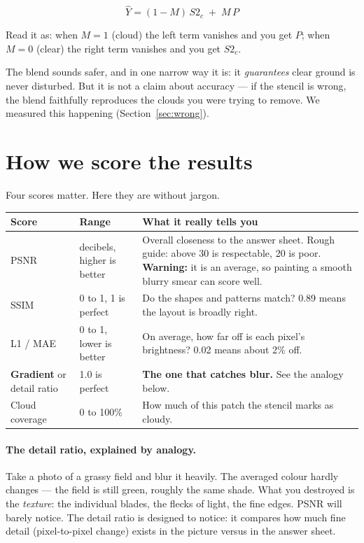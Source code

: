 \documentclass[11pt,a4paper]{article}
\newcommand{\term}[1]{\textbf{#1}}
\begin{document}
\begin{equation}
\hat Y = (1-M)\,S2_c \;+\; M\,P
\end{equation}

Read it as: when $M=1$ (cloud) the left term vanishes and you get $P$; when $M=0$ (clear) the right
term vanishes and you get $S2_c$.

The blend sounds safer, and in one narrow way it is: it \emph{guarantees} clear ground is never
disturbed. But it is not a claim about accuracy --- if the stencil is wrong, the blend faithfully
reproduces the clouds you were trying to remove. We measured this happening
(Section~\ref{sec:wrong}).

\section{How we score the results}

Four scores matter. Here they are without jargon.

\begin{center}
\begin{tabular}{@{}lp{4.2cm}p{6.0cm}@{}}
\hline
\textbf{Score} & \textbf{Range} & \textbf{What it really tells you} \\
\hline
PSNR & decibels, higher is better & Overall closeness to the answer sheet. Rough guide: above 30 is respectable, 20 is poor. \textbf{Warning:} it is an average, so painting a smooth blurry smear can score well. \\
SSIM & 0 to 1, 1 is perfect & Do the shapes and patterns match? 0.89 means the layout is broadly right. \\
L1 / MAE & 0 to 1, lower is better & On average, how far off is each pixel's brightness? 0.02 means about 2\% off. \\
\term{Gradient} or detail ratio & 1.0 is perfect & \textbf{The one that catches blur.} See the analogy below. \\
Cloud coverage & 0 to 100\% & How much of this patch the stencil marks as cloudy. \\
\hline
\end{tabular}
\end{center}

\paragraph{The detail ratio, explained by analogy.}
Take a photo of a grassy field and blur it heavily. The averaged colour hardly changes --- the field
is still green, roughly the same shade. What you destroyed is the \emph{texture}: the individual
blades, the flecks of light, the fine edges. PSNR will barely notice. The detail ratio is designed
to notice: it compares how much fine detail (pixel-to-pixel change) exists in the picture versus in
the answer sheet.
\end{document}
